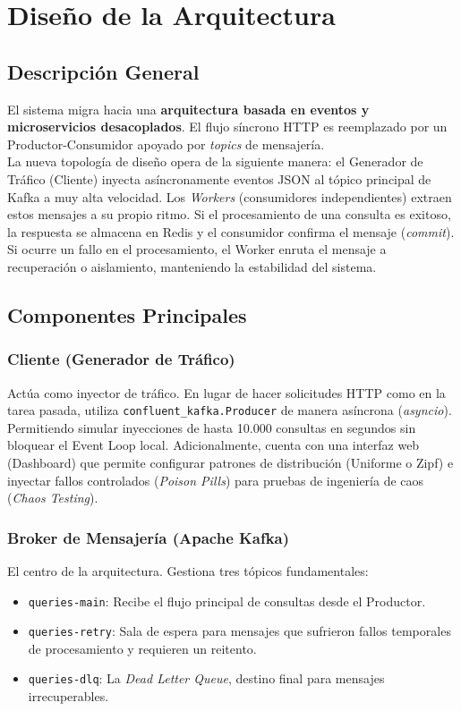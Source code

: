 \documentclass[letter,12pt]{article}
\begin{document}
\section{Diseño de la Arquitectura}
\subsection{Descripción General}

El sistema migra hacia una \textbf{arquitectura basada en eventos y microservicios desacoplados}. El flujo síncrono HTTP es reemplazado por un Productor-Consumidor apoyado por \textit{topics} de mensajería. 
\\
La nueva topología de diseño opera de la siguiente manera: el Generador de Tráfico (Cliente) inyecta asíncronamente eventos JSON al tópico principal de Kafka a muy alta velocidad. Los \textit{Workers} (consumidores independientes) extraen estos mensajes a su propio ritmo. Si el procesamiento de una consulta es exitoso, la respuesta se almacena en Redis y el consumidor confirma el mensaje (\textit{commit}). Si ocurre un fallo en el procesamiento, el Worker enruta el mensaje a recuperación o aislamiento, manteniendo la estabilidad del sistema.

\subsection{Componentes Principales}

\subsubsection{Cliente (Generador de Tráfico)}
Actúa como inyector de tráfico. En lugar de hacer solicitudes HTTP como en la tarea pasada, utiliza \texttt{confluent\_kafka.Producer} de manera asíncrona (\textit{asyncio}). Permitiendo simular inyecciones de hasta 10.000 consultas en segundos sin bloquear el Event Loop local. Adicionalmente, cuenta con una interfaz web (Dashboard) que permite configurar patrones de distribución (Uniforme o Zipf) e inyectar fallos controlados (\textit{Poison Pills}) para pruebas de ingeniería de caos (\textit{Chaos Testing}).

\subsubsection{Broker de Mensajería (Apache Kafka)}
El centro de la arquitectura. Gestiona tres tópicos fundamentales:
\begin{itemize}
    \item \texttt{queries-main}: Recibe el flujo principal de consultas desde el Productor.
    \item \texttt{queries-retry}: Sala de espera para mensajes que sufrieron fallos temporales de procesamiento y requieren un reitento.
    \item \texttt{queries-dlq}: La \textit{Dead Letter Queue}, destino final para mensajes irrecuperables.
\end{itemize}
\end{document}
